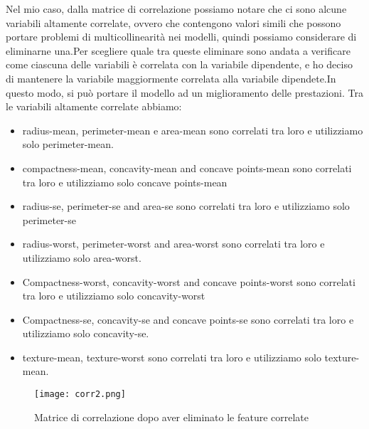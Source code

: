\documentclass{article}
\begin{document}
Nel mio caso, dalla matrice di correlazione possiamo notare che ci sono alcune variabili altamente correlate, ovvero che contengono valori simili che possono portare problemi di multicollinearità nei modelli, quindi possiamo considerare di eliminarne una.Per scegliere quale tra queste eliminare sono andata a verificare come ciascuna delle variabili è correlata con la variabile dipendente, e ho deciso di mantenere la variabile maggiormente correlata alla variabile dipendete.In questo modo, si può portare il modello ad un miglioramento delle prestazioni.
Tra le variabili altamente correlate abbiamo:
\begin{itemize}
    \item  radius-mean, perimeter-mean e area-mean sono correlati tra loro e utilizziamo solo perimeter-mean.
    \item compactness-mean, concavity-mean and concave points-mean sono correlati tra loro e utilizziamo solo  concave points-mean
    \item radius-se, perimeter-se and area-se sono correlati tra loro e utilizziamo solo  perimeter-se
    \item radius-worst, perimeter-worst and area-worst sono correlati tra loro e utilizziamo solo  area-worst.
    \item Compactness-worst, concavity-worst and concave points-worst sono correlati tra loro e utilizziamo solo  concavity-worst
    \item Compactness-se, concavity-se and concave points-se sono correlati tra loro e utilizziamo solo  concavity-se.
    \item texture-mean, texture-worst  sono correlati tra loro e utilizziamo solo  texture-mean.
\end{itemize}
\begin{figure}
    \centering
    \texttt{[image: corr2.png]}
    \caption{Matrice di correlazione dopo aver eliminato le feature correlate}
    \label{fig:enter-label}
\end{figure}

\newpage
\end{document}
